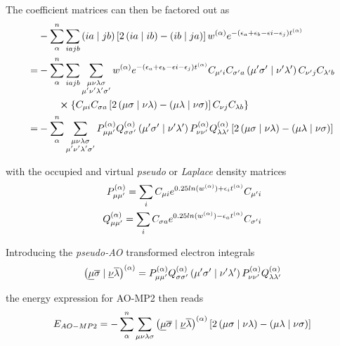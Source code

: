 \noindent The coefficient matrices can then be factored out as
\begin{equation}
\begin{split}
&- \sum_{\alpha}^n \sum_{iajb} \left( ia \mid jb \right) \left[2 \left( ia \mid ib \right) - \left( ib \mid ja \right) \right] w^{(\alpha)} e^{-\left(\epsilon_a + \epsilon_b - \epsilon i - \epsilon_j\right)t^{(\alpha)}} \\
= &- \sum_{\alpha}^n \sum_{iajb} \sum_{\substack{\mu\nu\lambda\sigma \\ \mu'\nu'\lambda'\sigma'} } w^{(\alpha)} e^{-\left(\epsilon_a + \epsilon_b - \epsilon i - \epsilon_j\right)t^{(\alpha)}} C_{\mu' i} C_{\sigma' a} \left( \mu'\sigma' \mid \nu'\lambda' \right) C_{\nu' j} C_{\lambda' b} \\ 
 & \qquad \cross \left\lbrace C_{\mu i} C_{\sigma a} \left [ 2\left( \mu\sigma \mid \nu\lambda \right) -  \left( \mu\lambda \mid \nu\sigma \right) \right] C_{\nu j} C_{\lambda b} \right\rbrace  \\
= & - \sum_{\alpha}^n \sum_{\substack{\mu\nu\lambda\sigma \\ \mu'\nu'\lambda'\sigma'}} P^{(\alpha)}_{\mu\mu'} Q^{(\alpha)}_{\sigma\sigma'} \left( \mu'\sigma' \mid \nu'\lambda' \right) P^{(\alpha)}_{\nu\nu'} Q^{(\alpha)}_{\lambda\lambda'} \left [ 2\left( \mu\sigma \mid \nu\lambda \right) -  \left( \mu\lambda \mid \nu\sigma \right) \right] 
\end{split}
\end{equation}

\noindent with the occupied and virtual \emph{pseudo} or \emph{Laplace} density matrices 
\begin{equation}
\begin{split}
P^{(\alpha)}_{\mu\mu'} = \sum_i C_{\mu i} e^{0.25 ln(w^{(\alpha)}) + \epsilon_i t^{(\alpha)}} C_{\mu' i} \\
Q^{(\alpha)}_{\mu\mu'} = \sum_i C_{\sigma a} e^{0.25 ln(w^{(\alpha)}) - \epsilon_a t^{(\alpha)}} C_{\sigma' i}
\end{split}
\end{equation}

\noindent Introducing the \emph{pseudo-AO} transformed electron integrals
\begin{equation}
\left( \underline{\mu}\overline{\sigma} \mid \underline{\nu}\overline{\lambda} \right)^{(\alpha)} = P^{(\alpha)}_{\mu\mu'} Q^{(\alpha)}_{\sigma\sigma'} \left( \mu'\sigma' \mid \nu'\lambda' \right) P^{(\alpha)}_{\nu\nu'} Q^{(\alpha)}_{\lambda\lambda'}
\label{eq:PSEUDOAOINTS}
\end{equation}

\noindent the energy expression for AO-MP2 then reads
\begin{equation}
E_{AO-MP2} = - \sum_{\alpha}^n \sum_{\mu\nu\lambda\sigma} \left( \underline{\mu}\overline{\sigma} \mid \underline{\nu}\overline{\lambda} \right)^{(\alpha)} \left [ 2\left( \mu\sigma \mid \nu\lambda \right) -  \left( \mu\lambda \mid \nu\sigma \right) \right]
\label{eq:AOMP2ENERGY}
\end{equation}

